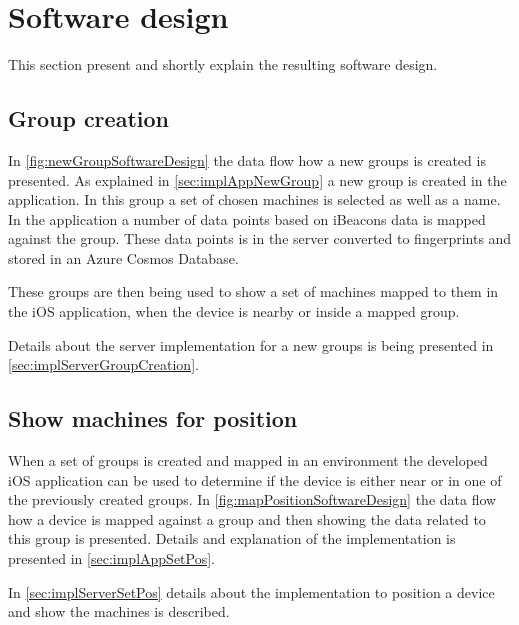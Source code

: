 \section{Software design}\label{sec:resultSoftwareDesign}
This section present and shortly explain the resulting software design.


\subsection{Group creation}\label{sec:resultsSoftwareDesignGroup}

In \cref{fig:newGroupSoftwareDesign} the data flow how a new groups is created is presented.
As explained in \cref{sec:implAppNewGroup} a new group is created in the application.
In this group a set of chosen machines is selected as well as a name.
In the application a number of data points based on iBeacons data is mapped against the group.
These data points is in the server converted to fingerprints and stored in an Azure Cosmos Database.

\bigskip

These groups are then being used to show a set of machines mapped to them in the iOS application, when the device is nearby or inside a mapped group.

\bigskip

Details about the server implementation for a new groups is being presented in \cref{sec:implServerGroupCreation}.


\subsection{Show machines for position}\label{sec:resultsSoftwareDesignPos}

When a set of groups is created and mapped in an environment the developed iOS application can be used to determine if the device is either near or in one of the previously created groups.
In \cref{fig:mapPositionSoftwareDesign} the data flow how a device is mapped against a group and then showing the data related to this group is presented.
Details and explanation of the implementation is presented in \cref{sec:implAppSetPos}.

\bigskip

In \cref{sec:implServerSetPos} details about the implementation to position a device and show the machines is described.

